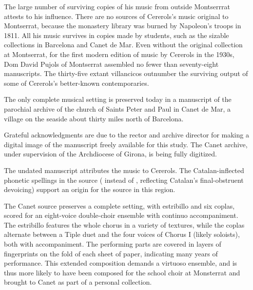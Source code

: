 
The large number of surviving copies of his music from outside Montserrrat
attests to his influence.
There are no sources of Cererols's music original to Montserrat, because the
monastery library was burned by Napoleon's troops in 1811.
All his music survives in copies made by students, such as the sizable
collections in Barcelona and Canet de Mar.
Even without the original collection at Montserrat, for the first modern edition
of music by Cererols in the 1930s, Dom David Pujols of Montserrat assembled no
fewer than seventy-eight manuscripts.%
    \Autocite{Cererols:MEM-VC}
The thirty-five extant villancicos outnumber the surviving output of some of
Cererols's better-known contemporaries.


The only complete musical setting is preserved today in a manuscript of the
parochial archive of the church of Saints Peter and Paul in Canet de Mar, a
village on the seaside about thirty miles north of Barcelona.%
\begin{Footnote}
    Grateful acknowledgments are due to the rector and archive director for
    making a digital image of the manuscript freely available for this study.
    The Canet archive, under supervision of the Archdiocese of Girona, is being
    fully digitized.
\end{Footnote}
The undated manuscript attributes the music to Cererols.%
    \Autocite{Bonastre:CanetCatalog}
The Catalan-inflected phonetic spellings in the source ( instead
of , reflecting Catalan's final-obstruent devoicing) support an
origin for the source in this region.%
    \Autocite{Myers:CatalanPhonology}


The Canet source preserves a complete setting, with estribillo and six coplas,
scored for an eight-voice double-choir ensemble with continuo accompaniment.
The estribillo features the whole chorus in a variety of textures, while the
coplas alternate between a Tiple duet and the four voices of Chorus I (likely
soloists), both with accompaniment.
The performing parts are covered in layers of fingerprints on the fold of each
sheet of paper, indicating many years of performance.
This extended composition demands a virtuoso ensemble, and is thus more likely
to have been composed for the school choir at Monsterrat and brought to Canet as
part of a personal collection.


